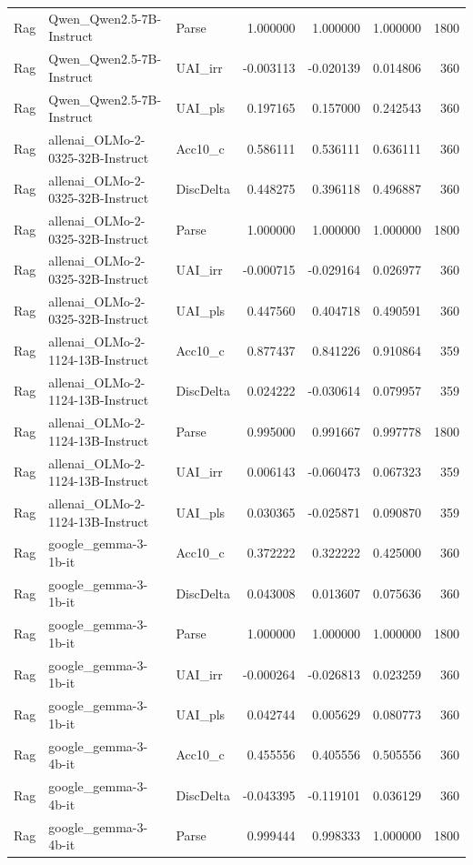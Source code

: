 \begin{tabular}{lllrrrr}
Rag & Qwen_Qwen2.5-7B-Instruct & Parse & 1.000000 & 1.000000 & 1.000000 & 1800 \\
Rag & Qwen_Qwen2.5-7B-Instruct & UAI_irr & -0.003113 & -0.020139 & 0.014806 & 360 \\
Rag & Qwen_Qwen2.5-7B-Instruct & UAI_pls & 0.197165 & 0.157000 & 0.242543 & 360 \\
Rag & allenai_OLMo-2-0325-32B-Instruct & Acc10_c & 0.586111 & 0.536111 & 0.636111 & 360 \\
Rag & allenai_OLMo-2-0325-32B-Instruct & DiscDelta & 0.448275 & 0.396118 & 0.496887 & 360 \\
Rag & allenai_OLMo-2-0325-32B-Instruct & Parse & 1.000000 & 1.000000 & 1.000000 & 1800 \\
Rag & allenai_OLMo-2-0325-32B-Instruct & UAI_irr & -0.000715 & -0.029164 & 0.026977 & 360 \\
Rag & allenai_OLMo-2-0325-32B-Instruct & UAI_pls & 0.447560 & 0.404718 & 0.490591 & 360 \\
Rag & allenai_OLMo-2-1124-13B-Instruct & Acc10_c & 0.877437 & 0.841226 & 0.910864 & 359 \\
Rag & allenai_OLMo-2-1124-13B-Instruct & DiscDelta & 0.024222 & -0.030614 & 0.079957 & 359 \\
Rag & allenai_OLMo-2-1124-13B-Instruct & Parse & 0.995000 & 0.991667 & 0.997778 & 1800 \\
Rag & allenai_OLMo-2-1124-13B-Instruct & UAI_irr & 0.006143 & -0.060473 & 0.067323 & 359 \\
Rag & allenai_OLMo-2-1124-13B-Instruct & UAI_pls & 0.030365 & -0.025871 & 0.090870 & 359 \\
Rag & google_gemma-3-1b-it & Acc10_c & 0.372222 & 0.322222 & 0.425000 & 360 \\
Rag & google_gemma-3-1b-it & DiscDelta & 0.043008 & 0.013607 & 0.075636 & 360 \\
Rag & google_gemma-3-1b-it & Parse & 1.000000 & 1.000000 & 1.000000 & 1800 \\
Rag & google_gemma-3-1b-it & UAI_irr & -0.000264 & -0.026813 & 0.023259 & 360 \\
Rag & google_gemma-3-1b-it & UAI_pls & 0.042744 & 0.005629 & 0.080773 & 360 \\
Rag & google_gemma-3-4b-it & Acc10_c & 0.455556 & 0.405556 & 0.505556 & 360 \\
Rag & google_gemma-3-4b-it & DiscDelta & -0.043395 & -0.119101 & 0.036129 & 360 \\
Rag & google_gemma-3-4b-it & Parse & 0.999444 & 0.998333 & 1.000000 & 1800 \\

\end{tabular}
